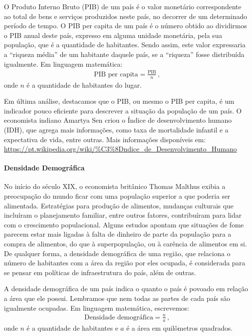 O Produto Interno Bruto (PIB) de um país é o valor monetário correspondente ao total de bens e serviços produzidos neste país, no decorrer de um determinado período de tempo. O PIB per capita de um país é o número obtido ao dividirmos o PIB anual deste país, expresso em alguma unidade monetária, pela sua população, que é a quantidade de habitantes. Sendo assim, este valor expressaria a “riqueza média” de um habitante daquele país, se a “riqueza” fosse distribuída igualmente. Em linguagem matemática:
\begin{equation*}
\begin{split}\text{PIB per capita} = \frac{\text{PIB}}{n} \, \text{,}\end{split}
\end{equation*}
onde $n$ é a quantidade de habitantes do lugar.

Em última análise, destacamos que o PIB, ou mesmo o PIB per capita, é um indicador pouco eficiente para descrever a situação da  população de um país. O economista indiano Amartya Sen criou o Índice de desenvolvimento humano (IDH), que agrega mais informações, como taxa de mortalidade infantil e a expectativa de vida, entre outras. Mais informações disponíveis em: \url{https://pt.wikipedia.org/wiki/\%C3\%8Dndice\_de\_Desenvolvimento\_Humano}

\paragraph{Densidade Demográfica}

No início do século XIX, o economista britânico Thomas Malthus exibia a preocupação do mundo ficar com uma população superior a que poderia ser alimentada. Estratégias para produção de alimentos, mudanças culturais que incluíram o planejamento familiar, entre outros fatores, contribuíram para lidar com o crescimento populacional. Alguns estudos apontam que situações de fome parecem estar mais ligadas à falta de dinheiro de parte da população para a compra de alimentos, do que à superpopulação, ou à carência de alimentos em si. De qualquer forma, a densidade demográfica de uma região, que relaciona o número de habitantes com a área da região por eles ocupada, é considerada para se pensar em políticas de infraestrutura do país, além de outras.

A densidade demográfica de um país indica o quanto o país é povoado em relação a área que ele possui. Lembramos que nem todas as partes de cada país são igualmente ocupadas. Em linguagem matemática, escrevemos:
\begin{equation*}
\begin{split}\text{Densidade demográfica} = \frac{n}{a} \, \text{,}\end{split}
\end{equation*}
onde $n$ é a quantidade de habitantes e $a$ é a área em quilômetros quadrados.

